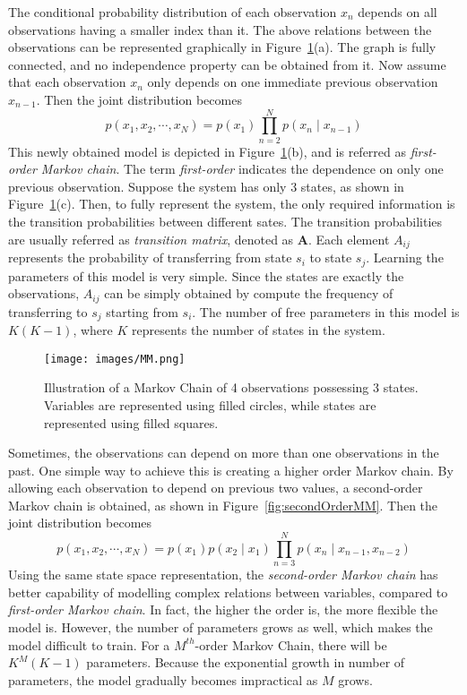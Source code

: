 The conditional probability distribution of each observation \(x_n\) depends on all observations having a smaller index than it. The above relations between the observations can be represented graphically in Figure~\ref{fig:MM}(a). The graph is fully connected, and no independence property can be obtained from it. Now assume that each observation \(x_n\) only depends on one immediate previous observation \(x_{n-1}\). Then the joint distribution becomes 
\begin{equation}
	p(x_1, x_2, \cdots, x_N) = p(x_1)\prod_{n = 2}^{N} p(x_n \mid x_{n-1})
\end{equation}
This newly obtained model is depicted in Figure~\ref{fig:MM}(b), and is referred as \textit{first-order Markov chain}. The term \textit{first-order} indicates the dependence on only one previous observation. Suppose the system has only 3 states, as shown in Figure~\ref{fig:MM}(c). Then, to fully represent the system, the only required information is the transition probabilities between different sates. The transition probabilities are usually referred as \textit{transition matrix}, denoted as \(\mathbf{A}\). Each element \(A_{ij}\) represents the probability of transferring from state \(s_i\) to state \(s_j\). Learning the parameters of this model is very simple. Since the states are exactly the observations, \(A_{ij}\) can be simply obtained by compute the frequency of transferring to \(s_j\) starting from \(s_i\). The number of free parameters in this model is \(K(K-1)\), where \(K\) represents the number of states in the system.

\begin{figure}[!ht]
	\begin{center}
		\texttt{[image: images/MM.png]}
		\caption{Illustration of a Markov Chain of 4 observations possessing 3 states. Variables are represented using filled circles, while states are represented using filled squares.}
		\label{fig:MM}
	\end{center}
\end{figure}

Sometimes, the observations can depend on more than one observations in the past. One simple way to achieve this is creating a higher order Markov chain. By allowing each observation to depend on previous two values, a second-order Markov chain is obtained, as shown in Figure~\ref{fig:secondOrderMM}. Then the joint distribution becomes
\begin{equation}
	p(x_1, x_2, \cdots, x_N) = p(x_1)p(x_2 \mid x_1)\prod_{n = 3}^{N} p(x_n \mid x_{n-1}, x_{n-2})
\end{equation}
Using the same state space representation, the \textit{second-order Markov chain} has better capability of modelling complex relations between variables, compared to \textit{first-order Markov chain}. In fact, the higher the order is, the more flexible the model is. However, the number of parameters grows as well, which makes the model difficult to train. For a \(M^{th}\)-order Markov Chain, there will be \(K^{M}(K-1)\) parameters. Because the exponential growth in number of parameters, the model gradually becomes impractical as \(M\) grows. 

